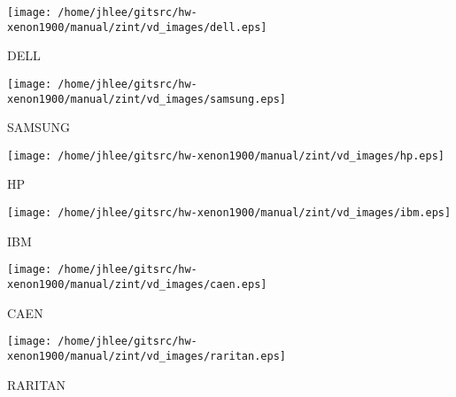 \noindent
\vspace{1cm}
\begin{minipage}{.2\textwidth}
\begin{center}
\texttt{[image: /home/jhlee/gitsrc/hw-xenon1900/manual/zint/vd\_images/dell.eps]}
\end{center}
\end{minipage}
\begin{minipage}{.7\textwidth}
DELL
\end{minipage}


\noindent
\vspace{1cm}
\begin{minipage}{.2\textwidth}
\begin{center}
\texttt{[image: /home/jhlee/gitsrc/hw-xenon1900/manual/zint/vd\_images/samsung.eps]}
\end{center}
\end{minipage}
\begin{minipage}{.7\textwidth}
SAMSUNG
\end{minipage}


\noindent
\vspace{1cm}
\begin{minipage}{.2\textwidth}
\begin{center}
\texttt{[image: /home/jhlee/gitsrc/hw-xenon1900/manual/zint/vd\_images/hp.eps]}
\end{center}
\end{minipage}
\begin{minipage}{.7\textwidth}
HP
\end{minipage}


\noindent
\vspace{1cm}
\begin{minipage}{.2\textwidth}
\begin{center}
\texttt{[image: /home/jhlee/gitsrc/hw-xenon1900/manual/zint/vd\_images/ibm.eps]}
\end{center}
\end{minipage}
\begin{minipage}{.7\textwidth}
IBM
\end{minipage}


\noindent
\vspace{1cm}
\begin{minipage}{.2\textwidth}
\begin{center}
\texttt{[image: /home/jhlee/gitsrc/hw-xenon1900/manual/zint/vd\_images/caen.eps]}
\end{center}
\end{minipage}
\begin{minipage}{.7\textwidth}
CAEN
\end{minipage}


\noindent
\vspace{1cm}
\begin{minipage}{.2\textwidth}
\begin{center}
\texttt{[image: /home/jhlee/gitsrc/hw-xenon1900/manual/zint/vd\_images/raritan.eps]}
\end{center}
\end{minipage}
\begin{minipage}{.7\textwidth}
RARITAN
\end{minipage}


